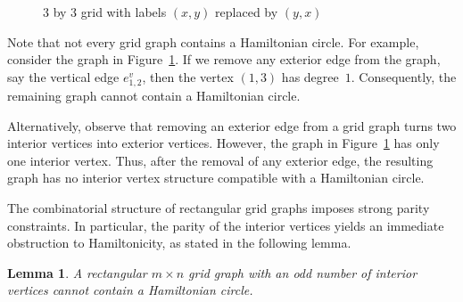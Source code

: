 \documentclass[12pt]{amsart}
\theoremstyle{theorem}%
\newtheorem{lemma}[theorem]{Lemma}
\theoremstyle{definition}%
\begin{document}
\begin{figure}[H]
\centering
{}
\caption{3 by 3 grid with labels $(x,y)$ replaced by $(y,x)$}
\label{3by3}
\end{figure}


Note that not every grid graph contains a Hamiltonian circle.
For example, consider the graph in Figure~\ref{3by3}.
If we remove any exterior edge from the graph, say the vertical edge $e^{v}_{1,2}$, then the vertex $(1,3)$ has degree~$1$.
Consequently, the remaining graph cannot contain a Hamiltonian circle.

Alternatively, observe that removing an exterior edge from a grid graph turns two interior vertices into exterior vertices.
However, the graph in Figure~\ref{3by3} has only one interior vertex.
Thus, after the removal of any exterior edge, the resulting graph has no interior vertex structure compatible with a Hamiltonian circle.





The combinatorial structure of rectangular grid graphs imposes strong parity constraints. In particular, the parity of the interior vertices yields an immediate obstruction to Hamiltonicity, as stated in the following lemma.

\begin{lemma}
A rectangular $m\times n$ grid graph with an odd number of interior vertices cannot contain a Hamiltonian circle.
\end{lemma}
\end{document}
